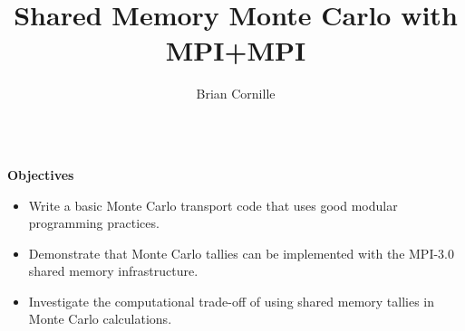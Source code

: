 \documentclass{beamer}
\title[ShMemMC]{\Huge\textbf{Shared Memory Monte Carlo with MPI+MPI}}
\author{\normalsize Brian Cornille}
\institute{\normalsize University of Wisconsin-Madison, Department of Engineering Physics}
\begin{document}
\begin{frame}[t,fragile]{}

\begin{beamercolorbox}[center]{}
\maketitle
\end{beamercolorbox}

\begin{columns}[t,totalwidth=\textwidth]

\begin{column}{0.3\textwidth}

\begin{block}{\LARGE\textbf{Objectives}}
\begin{itemize}
\item Write a basic Monte Carlo transport code that uses good modular programming practices.
\item Demonstrate that Monte Carlo tallies can be implemented with
the MPI-3.0 shared memory infrastructure.
\item Investigate the computational trade-off of using shared memory tallies
in Monte Carlo calculations.
\end{itemize}
\end{block}


\end{column}
\end{columns}
\end{frame}
\end{document}
